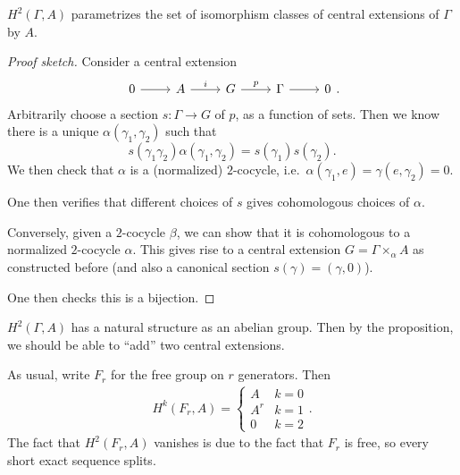 \documentclass[a4paper]{article}
\newcommand\Free{F}
\begin{document}
\begin{prop}
  $H^2(\Gamma, A)$ parametrizes the set of isomorphism classes of central extensions of $\Gamma$ by $A$.
\end{prop}

\begin{proof}[Proof sketch]
  Consider a central extension
  \[
    \begin{tikzcd}
      0 \ar[r] & A \ar[r, "i"] & G \ar[r, "p"] & \Gamma \ar[r] & 0
    \end{tikzcd}.
  \]
  Arbitrarily choose a section $s: \Gamma \to G$ of $p$, as a function of sets. Then we know there is a unique $\alpha(\gamma_1, \gamma_2)$ such that
  \[
    s(\gamma_1 \gamma_2) \alpha(\gamma_1, \gamma_2) = s(\gamma_1) s(\gamma_2).
  \]
  We then check that $\alpha$ is a (normalized) $2$-cocycle, i.e.\ $\alpha(\gamma_1, e) = \gamma(e, \gamma_2) = 0$.

  One then verifies that different choices of $s$ gives cohomologous choices of $\alpha$.

  Conversely, given a $2$-cocycle $\beta$, we can show that it is cohomologous to a normalized $2$-cocycle $\alpha$. This gives rise to a central extension $G = \Gamma \times_\alpha A$ as constructed before (and also a canonical section $s(\gamma) = (\gamma, 0)$).

  One then checks this is a bijection.
\end{proof}

\begin{ex}
  $H^2(\Gamma, A)$ has a natural structure as an abelian group. Then by the proposition, we should be able to ``add'' two central extensions.
\end{ex}

\begin{eg}
  As usual, write $\Free_r$ for the free group on $r$ generators. Then
  \begin{align*}
    H^k(\Free_r, A) =
    \begin{cases}
      A & k = 0\\
      A^r & k = 1\\
      0 & k = 2
    \end{cases}.
  \end{align*}
  The fact that $H^2(\Free_r, A)$ vanishes is due to the fact that $\Free_r$ is free, so every short exact sequence splits.
\end{eg}
\end{document}
